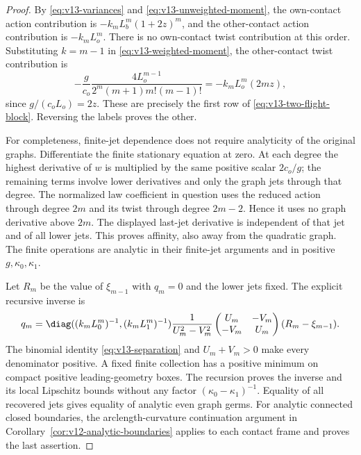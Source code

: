 \begin{proof}
By \eqref{eq:v13-variances} and \eqref{eq:v13-unweighted-moment},
the own-contact action contribution is $-k_m L_b^m(1+2z)^m$,
and the other-contact action contribution is $-k_mL_o^m$.
There is no own-contact twist contribution at this order. Substituting
$k=m-1$ in \eqref{eq:v13-weighted-moment}, the other-contact twist
contribution is
\[
 -\frac{g}{c_o}\frac{4L_o^{m-1}}
             {2^m(m+1)m!(m-1)!}
       =-k_m L_o^m(2mz),
\]
since $g/(c_oL_o)=2z$. These are precisely the first row of
\eqref{eq:v13-two-flight-block}. Reversing the labels proves the other.

For completeness, finite-jet dependence does not require analyticity
of the original graphs. Differentiate the finite stationary equation
at zero. At each degree the highest derivative of $w$ is multiplied
by the same positive scalar $2c_o/g$; the remaining terms involve
lower derivatives and only the graph jets through that degree.
The normalized law coefficient in question uses the reduced action
through degree $2m$ and its twist through degree $2m-2$. Hence it
uses no graph derivative above $2m$. The displayed last-jet derivative
is independent of that jet and of all lower jets. This proves affinity,
also away from the quadratic graph. The finite operations are analytic
in their finite-jet arguments and in positive $g,\kappa_0,\kappa_1$.

Let $R_m$ be the value of $\xi_{m-1}$ with $q_m=0$ and the lower
jets fixed. The explicit recursive inverse is
\begin{equation}\label{eq:v13-recursion}
 q_m=\diag((k_mL_0^m)^{-1},(k_mL_1^m)^{-1})
       \frac{1}{U_m^2-V_m^2}
       \begin{pmatrix}U_m&-V_m\\-V_m&U_m\end{pmatrix}
                         (R_m-\xi_{m-1}).
\end{equation}
The binomial identity \eqref{eq:v13-separation} and $U_m+V_m>0$
make every denominator positive. A fixed finite collection has a
positive minimum on compact positive leading-geometry boxes. The
recursion proves the inverse and its local Lipschitz bounds without
any factor $(\kappa_0-\kappa_1)^{-1}$. Equality of all recovered jets
gives equality of analytic even graph germs. For analytic connected
closed boundaries, the arclength-curvature continuation argument in
Corollary~\ref{cor:v12-analytic-boundaries} applies to each contact
frame and proves the last assertion.
\end{proof}

